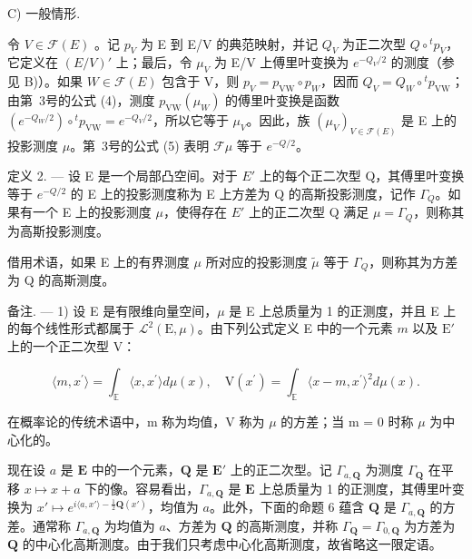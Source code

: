 C) 一般情形.

令 \(V \in \mathcal{F}(E)\) 。记 \(p_V\) 为 E 到 E/V 的典范映射，并记 \(Q_V\) 为正二次型 \(Q \circ {}^t p_V\)，它定义在 \((E/V)'\) 上；最后，令 \(\mu_V\) 为 E/V 上傅里叶变换为 \(e^{-Q_V/2}\) 的测度（参见 B)）。如果 \(W \in \mathcal{F}(E)\) 包含于 V，则 \(p_V = p_{\text{VW}} \circ p_W\)，因而 \(Q_V = Q_W \circ {}^t p_{\text{VW}}\)；由第~3号的公式 (4)，测度 \(p_{\text{VW}}(\mu_W)\) 的傅里叶变换是函数 \((e^{-Q_W/2}) \circ {}^t p_{\text{VW}} = e^{-Q_V/2}\)，所以它等于 \(\mu_V\)。因此，族 \((\mu_V)_{V \in \mathcal{F}(E)}\) 是 E 上的投影测度 \(\mu\)。第~3号的公式 (5) 表明 \(\mathcal{F}\mu\) 等于 \(e^{-Q/2}\)。

定义 2. --- 设 E 是一个局部凸空间。对于 \(E'\) 上的每个正二次型 Q，其傅里叶变换等于 \(e^{-Q/2}\) 的 E 上的投影测度称为 E 上方差为 Q 的高斯投影测度，记作 \(\Gamma_{Q}\)。如果有一个 E 上的投影测度 \(\mu\)，使得存在 \(E'\) 上的正二次型 Q 满足 \(\mu = \Gamma_{Q}\)，则称其为高斯投影测度。

借用术语，如果 E 上的有界测度 \(\mu\) 所对应的投影测度 \(\widetilde{\mu}\) 等于 \(\Gamma_{Q}\)，则称其为方差为 Q 的高斯测度。

备注. --- 1) 设 E 是有限维向量空间，\(\mu\) 是 E 上总质量为 1 的正测度，并且 E 上的每个线性形式都属于 \(\mathcal{L}^{2}(\mathrm{E},\mu)\)。由下列公式定义 E 中的一个元素 \(m\) 以及 \(\mathrm{E}'\) 上的一个正二次型 V：

\[
\langle m, x ^ {\prime} \rangle = \int_ {\mathbb {E}} \langle x, x ^ {\prime} \rangle d \mu (x), \quad \mathrm{V} (x ^ {\prime}) = \int_ {\mathbb {E}} \langle x - m, x ^ {\prime} \rangle^ {2} d \mu (x).
\]

在概率论的传统术语中，m 称为均值，V 称为 \(\mu\) 的方差；当 m = 0 时称 \(\mu\) 为中心化的。

现在设 \(a\) 是 \(\mathbf{E}\) 中的一个元素，\(\mathbf{Q}\) 是 \(\mathbf{E}'\) 上的正二次型。记 \(\Gamma_{a,\mathbf{Q}}\) 为测度 \(\Gamma_{\mathbf{Q}}\) 在平移 \(x \mapsto x + a\) 下的像。容易看出，\(\Gamma_{a,\mathbf{Q}}\) 是 \(\mathbf{E}\) 上总质量为 1 的正测度，其傅里叶变换为 \(x' \mapsto e^{i\langle a,x'\rangle - \frac{1}{2}\mathbf{Q}(x')}\)，均值为 \(a\)。此外，下面的命题 6 蕴含 \(\mathbf{Q}\) 是 \(\Gamma_{a,\mathbf{Q}}\) 的方差。通常称 \(\Gamma_{a,\mathbf{Q}}\) 为均值为 \(a\)、方差为 \(\mathbf{Q}\) 的高斯测度，并称 \(\Gamma_{\mathbf{Q}} = \Gamma_{0,\mathbf{Q}}\) 为方差为 \(\mathbf{Q}\) 的中心化高斯测度。由于我们只考虑中心化高斯测度，故省略这一限定语。

